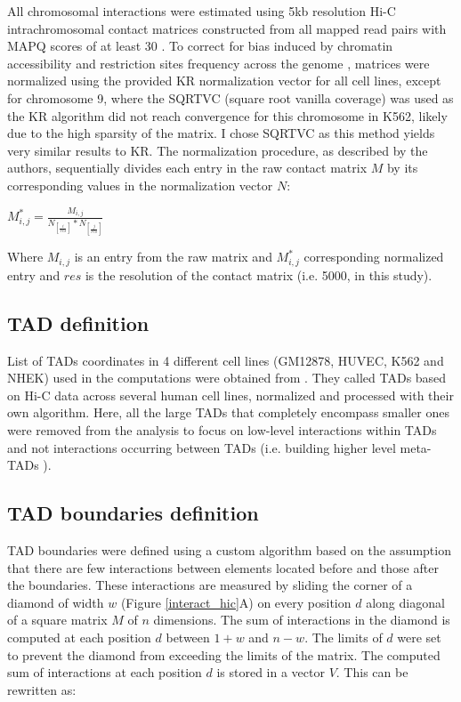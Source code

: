 \documentclass[11pt,a4paper]{report}
\begin{document}
All chromosomal interactions were estimated using 5kb resolution Hi-C intrachromosomal contact matrices constructed from all mapped read pairs with MAPQ scores of at least 30 \cite{Rao2014}. To correct for bias induced by chromatin accessibility and restriction sites frequency across the genome \cite{Rao2014}, matrices were normalized using the provided KR normalization vector for all cell lines, except for chromosome 9, where the SQRTVC (square root vanilla coverage) was used as the KR algorithm did not reach convergence for this chromosome in K562, likely due to the high sparsity of the matrix. I chose SQRTVC as this method yields very similar results to KR. 
The normalization procedure, as described by the authors, sequentially divides each entry in the raw contact matrix $M$ by its corresponding values in the normalization vector $N$:

\vspace{0.2in}
$M^*_{i,j}=\frac{M_{i,j}}{N_{[\frac{i}{res}]}*N_{[\frac{j}{res}]}}$
\vspace{0.2in}

\noindent Where $M_{i,j}$ is an entry from the raw matrix and $M^*_{i,j}$ corresponding normalized entry and $res$ is the resolution of the contact matrix (i.e. 5000, in this study).

\subsection*{TAD definition}

List of TADs coordinates in 4 different cell lines (GM12878, HUVEC, K562 and NHEK) used in the computations were obtained from \cite{Rao2014}. They called TADs based on Hi-C data across several human cell lines, normalized and processed with their own algorithm. Here, all the large TADs that completely encompass smaller ones were removed from the analysis to focus on low-level interactions within TADs and not interactions occurring between TADs (i.e. building higher level meta-TADs \cite{Fraser2015}).

\subsection*{TAD boundaries definition}

TAD boundaries were defined using a custom algorithm based on the assumption that there are few interactions between elements located before and those after the boundaries. These interactions are measured by sliding the corner of a diamond of width $w$ (Figure \ref{interact_hic}A) on every position $d$ along diagonal of a square matrix $M$ of $n$ dimensions. The sum of interactions in the diamond is computed at each position $d$ between $1+w$ and $n-w$. The limits of $d$ were set to prevent the diamond from exceeding the limits of the matrix. The computed sum of interactions at each position $d$ is stored in a vector $V$. This can be rewritten as: 
\end{document}
